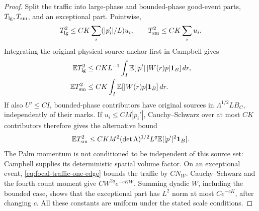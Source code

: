 \documentclass[11pt,reqno]{amsart}
\theoremstyle{definition}
\theoremstyle{remark}
\numberwithin{equation}{section}
\newcommand{\E}{\mathbb E}
\begin{document}
\begin{proof}
Split the traffic into large-phase and bounded-phase good-event parts,
$T_{\rm lg},T_{\rm sm}$, and an exceptional part. Pointwise,
\[
 T_{\rm lg}^2\le CK\sum_i (|p_i'|/L)u_i,
 \qquad T_{\rm sm}^2\le CK\sum_i u_i.
\]
Integrating the original physical source anchor first in Campbell gives
\begin{align}
 \E T_{\rm lg}^2&\le CK L^{-1}
        \int_I\E[|p'|\,|W(r)p|\mathbf1_B]\,dr,
       \label{eq:focal-traffic-large}\\
 \E T_{\rm sm}^2&\le CK\int_I\E[|W(r)p|\mathbf1_B]\,dr.
       \label{eq:focal-traffic-small-first}
\end{align}
If also $U'\le CI$, bounded-phase contributors have original sources
in $\Lambda^{1/2}L B_C$, independently of their marks. If
$u_i\le CM|p_i'|$, Cauchy--Schwarz over at most $CK$ contributors
therefore gives the alternative bound
\begin{equation}\label{eq:focal-traffic-small-second}
 \E T_{\rm sm}^2\le CK M^2(\det\Lambda)^{1/2}L^q
                                      \E[|p'|^2\mathbf1_B].
\end{equation}
The Palm momentum is not conditioned to be independent of this source
set: Campbell supplies its deterministic spatial volume factor.
On an exceptional event, \eqref{eq:focal-traffic-one-edge} bounds the
traffic by $CN_W$. Cauchy--Schwarz and the fourth count moment give
$CW^{2q}e^{-cKW}$. Summing dyadic $W$, including the bounded case,
shows that the exceptional part has $L^2$ norm at most $Ce^{-cK}$,
after changing $c$. All these constants are uniform under the stated
scale conditions.


\end{proof}
\end{document}
